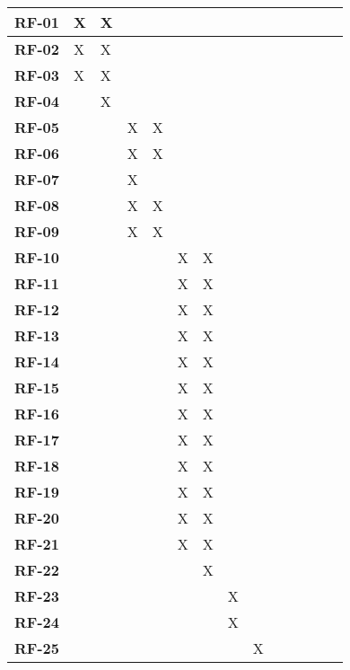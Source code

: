 \begin{center}
\begin{longtable}{ c | p{0.75cm} p{0.75cm} p{0.75cm} p{0.75cm} p{0.75cm} p{0.75cm} p{0.75cm} p{0.75cm} p{0.75cm} p{0.75cm} p{0.75cm} p{0.75cm} p{0.75cm} }
	\textbf{RF-01} & X & X &  &  &  &  &  &  &  &  &  &  &  \\ \hline
	\textbf{RF-02} & X & X &  &  &  &  &  &  &  &  &  &  &  \\ \hline
	\textbf{RF-03} & X & X &  &  &  &  &  &  &  &  &  &  &  \\ \hline
	\textbf{RF-04} &  & X &  &  &  &  &  &  &  &  &  &  &  \\ \hline
	\textbf{RF-05} &  &  & X & X &  &  &  &  &  &  &  &  &  \\ \hline
	\textbf{RF-06} &  &  & X & X &  &  &  &  &  &  &  &  &  \\ \hline
	\textbf{RF-07} &  &  & X &  &  &  &  &  &  &  &  &  &  \\ \hline
	\textbf{RF-08} &  &  & X & X &  &  &  &  &  &  &  &  &  \\ \hline
	\textbf{RF-09} &  &  & X & X &  &  &  &  &  &  &  &  &  \\ \hline
	\textbf{RF-10} &  &  &  &  & X & X &  &  &  &  &  &  &  \\ \hline
	\textbf{RF-11} &  &  &  &  & X & X &  &  &  &  &  &  &  \\ \hline
	\textbf{RF-12} &  &  &  &  & X & X &  &  &  &  &  &  &  \\ \hline
	\textbf{RF-13} &  &  &  &  & X & X &  &  &  &  &  &  &  \\ \hline
	\textbf{RF-14} &  &  &  &  & X & X &  &  &  &  &  &  &  \\ \hline
	\textbf{RF-15} &  &  &  &  & X & X &  &  &  &  &  &  &  \\ \hline
	\textbf{RF-16} &  &  &  &  & X & X &  &  &  &  &  &  &  \\ \hline
	\textbf{RF-17} &  &  &  &  & X & X &  &  &  &  &  &  &  \\ \hline
	\textbf{RF-18} &  &  &  &  & X & X &  &  &  &  &  &  &  \\ \hline
	\textbf{RF-19} &  &  &  &  & X & X &  &  &  &  &  &  &  \\ \hline
	\textbf{RF-20} &  &  &  &  & X & X &  &  &  &  &  &  &  \\ \hline
	\textbf{RF-21} &  &  &  &  & X & X &  &  &  &  &  &  &  \\ \hline
	\textbf{RF-22} &  &  &  &  &  & X &  &  &  &  &  &  &  \\ \hline
	\textbf{RF-23} &  &  &  &  &  &  & X &  &  &  &  &  &  \\ \hline
	\textbf{RF-24} &  &  &  &  &  &  & X &  &  &  &  &  &  \\ \hline
	\textbf{RF-25} &  &  &  &  &  &  &  & X &  &  &  &  &  \\ \hline

\end{longtable}
\end{center}
